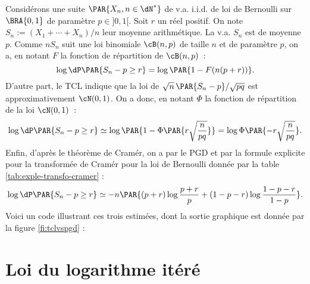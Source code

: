 \begin{xpl}
  Considérons une suite $\PAR{X_n,n\in\dN^*}$ de v.a. i.i.d. de loi de
  Bernoulli sur $\BRA{0,1}$ de paramètre $p\in]0,1[$. Soit $r$ un réel
  positif. On note $S_n:=(X_1+\cdots+X_n)/n$ leur moyenne arithmétique. La
  v.a. $S_n$ est de moyenne $p$. Comme $nS_n$ suit une loi binomiale
  $\cB(n,p)$ de taille $n$ et de paramètre $p$, on a, en notant $F$ la
  fonction de répartition de $\cB(n,p)$~:
  $$
  \log \dP\PAR{S_n-p \geq r}= \log \PAR{1-F(n(p+r))}.
  $$
  D'autre part, le TCL indique que la loi de
  $\sqrt{n}\,\PAR{S_n-p}/\sqrt{pq}$ est approximativement $\cN(0,1)$. On a
  donc, en notant $\Phi$ la fonction de répartition de la loi $\cN(0,1)$~:
  $$
  \log \dP\PAR{S_n-p \geq r} \simeq \log \PAR{1-\Phi\PAR{r\sqrt{\frac{n}{pq}}}}
  = \log \Phi\PAR{-r\sqrt{\frac{n}{pq}}}.
  $$
  Enfin, d'après le théorème de Cramér, on a par le PGD et par la formule
  explicite pour la transformée de Cramér pour la loi de Bernoulli donnée par
  la table \ref{tab:exple-transfo-cramer} :
  $$
  \log \dP\PAR{S_n-p \geq r}
  \simeq -n\PAR{(p+r)\log\frac{p+r}{p} + (1-p-r)\log\frac{1-p-r}{1-p}}.
  $$  
  Voici un code \ML{} illustrant ces trois estimées, dont la sortie graphique
  est donnée par la figure \ref{fi:tclvspgd} :
\end{xpl}


%
\section{Loi du logarithme itéré}
%

